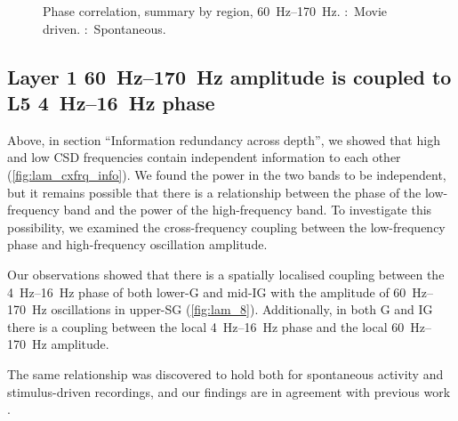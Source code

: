 \begin{figure}[htbp]
    \centering
    \hspace*{\fill}
    \hspace*{\fill}\hspace{.2cm}\hspace*{\fill}
    \hspace*{\fill}
    \caption{Phase correlation, summary by region, \SIrange{60}{170}{Hz}.
\protect{}:~Movie driven.
\protect{}:~Spontaneous.
}
\label{fig:lam_phasestats_gamma_summary_csd}
\end{figure}


\FloatBarrier
\subsection{Layer 1 \SIrange{60}{170}{Hz} amplitude is coupled to L5 \SIrange{4}{16}{Hz} phase}

Above, in section ``Information redundancy across depth'', we showed that high and low \ac{CSD} frequencies contain independent information to each other (\autoref{fig:lam_cxfrq_info}).
We found the power in the two bands to be independent, but it remains possible that there is a relationship between the phase of the low-frequency band and the power of the high-frequency band.
To investigate this possibility, we examined the cross-frequency coupling between the low-frequency phase and high-frequency oscillation amplitude.

Our observations showed that there is a spatially localised coupling between the \SIrange{4}{16}{Hz} phase of both lower-\ac{G} and mid-\ac{IG} with the amplitude of \SIrange{60}{170}{Hz} oscillations in upper-\ac{SG} (\autoref{fig:lam_8}).
Additionally, in both \ac{G} and \ac{IG} there is a coupling between the local \SIrange{4}{16}{Hz} phase and the local \SIrange{60}{170}{Hz} amplitude.

The same relationship was discovered to hold both for spontaneous activity and stimulus-driven recordings, and our findings are in agreement with previous work \citep{Spaak2012}.

